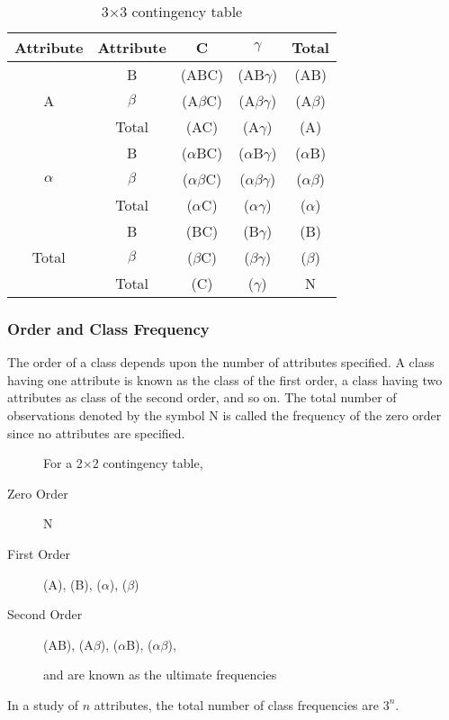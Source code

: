 \documentclass[
10pt, %
a4paper, %
]{report}
\begin{document}
\begin{table}
\begin{center}
\begin{tabular}{|c|c|c|c|c|}
\hline
Attribute & Attribute & C & \(\gamma\) & Total \\ \hline
\multirow{3}{*}{A} & B & (ABC) & (AB\(\gamma\)) & (AB) \\ \cline{2-5} 
 & \(\beta\) & (A\(\beta\)C) & (A\(\beta\gamma\)) & (A\(\beta\)) \\ \cline{2-5} 
 & Total & (AC) & (A\(\gamma\)) & (A) \\ \hline
\multirow{3}{*}{\(\alpha\)} & B & (\(\alpha\)BC) & (\(\alpha\)B\(\gamma\)) & (\(\alpha\)B) \\ \cline{2-5} 
 & \(\beta\) & (\(\alpha\beta\)C) & (\(\alpha\beta\gamma\)) & (\(\alpha\beta\)) \\ \cline{2-5} 
 & Total & (\(\alpha\)C) & (\(\alpha\gamma\)) & (\(\alpha\)) \\ \hline
\multirow{3}{*}{Total} & B & (BC) & (B\(\gamma\)) & (B) \\ \cline{2-5} 
 & \(\beta\) & (\(\beta\)C) & (\(\beta\gamma\)) & (\(\beta\)) \\ \cline{2-5} 
 & Total & (C) & (\(\gamma\)) & N \\ \hline
\end{tabular}
\end{center}
\caption{3\(\times\)3 contingency table}
\label{tab:3x3}
\end{table}

\subsubsection{Order and Class Frequency}
The order of a class depends upon the number of
attributes specified. A class having one attribute is known as the class of the first order, a class having two attributes as class of the second order, and so on. The total number of observations denoted by the symbol N is called the frequency of the zero order since no attributes are specified.

\begin{description}
\item[] For a 2\(\times\)2 contingency table,
\item[Zero Order] N
\item[First Order] (A), (B), (\(\alpha\)), (\(\beta\))
\item[Second Order] (AB), (A\(\beta\)), (\(\alpha\)B), (\(\alpha\beta\)),
\item[] and are known as the ultimate frequencies
\end{description}
In a study of \(n\) attributes, the total number of class frequencies are \(3^n\).
\end{document}
